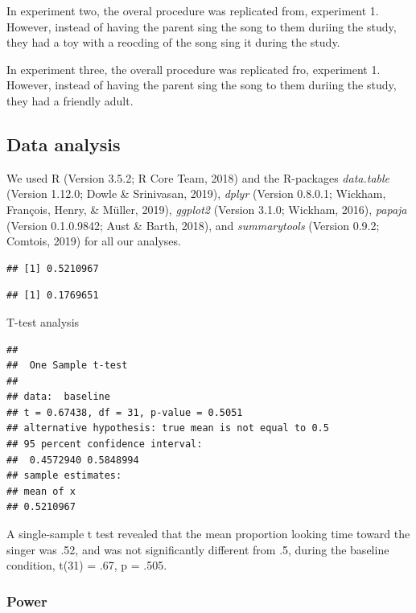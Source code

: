 \documentclass[man]{apa6}
\begin{document}
In experiment two, the overal procedure was replicated from, experiment
1. However, instead of having the parent sing the song to them duriing
the study, they had a toy with a reocding of the song sing it during the
study.

In experiment three, the overall procedure was replicated fro,
experiment 1. However, instead of having the parent sing the song to
them duriing the study, they had a friendly adult.

\subsection{Data analysis}\label{data-analysis}

We used R (Version 3.5.2; R Core Team, 2018) and the R-packages
\emph{data.table} (Version 1.12.0; Dowle \& Srinivasan, 2019),
\emph{dplyr} (Version 0.8.0.1; Wickham, François, Henry, \& Müller,
2019), \emph{ggplot2} (Version 3.1.0; Wickham, 2016), \emph{papaja}
(Version 0.1.0.9842; Aust \& Barth, 2018), and \emph{summarytools}
(Version 0.9.2; Comtois, 2019) for all our analyses.

\begin{verbatim}
## [1] 0.5210967
\end{verbatim}

\begin{verbatim}
## [1] 0.1769651
\end{verbatim}

T-test analysis

\begin{verbatim}
## 
##  One Sample t-test
## 
## data:  baseline
## t = 0.67438, df = 31, p-value = 0.5051
## alternative hypothesis: true mean is not equal to 0.5
## 95 percent confidence interval:
##  0.4572940 0.5848994
## sample estimates:
## mean of x 
## 0.5210967
\end{verbatim}

A single-sample t test revealed that the mean proportion looking time
toward the singer was .52, and was not significantly different from .5,
during the baseline condition, t(31) = .67, p = .505.

\subsubsection{Power}\label{power}
\end{document}
